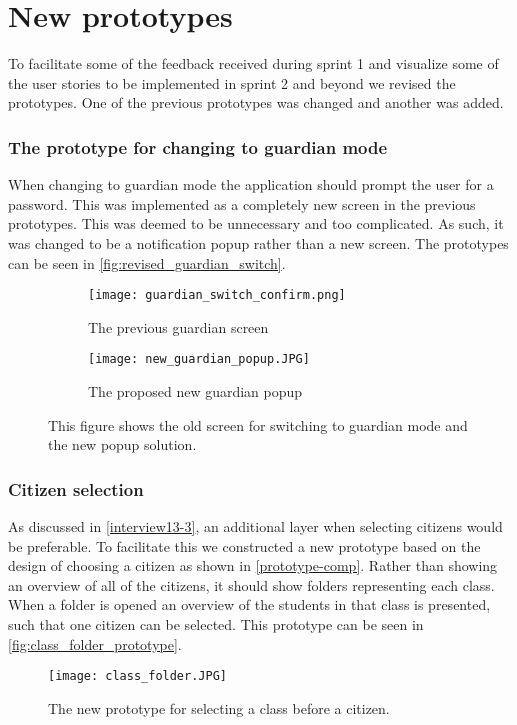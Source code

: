\section{New prototypes}
To facilitate some of the feedback received during sprint 1 and visualize some of the user stories to be implemented in sprint 2 and beyond we revised the prototypes.
One of the previous prototypes was changed and another was added.

\subsubsection{The prototype for changing to guardian mode}
When changing to guardian mode the application should prompt the user for a password.
This was implemented as a completely new screen in the previous prototypes.
This was deemed to be unnecessary and too complicated.
As such, it was changed to be a notification popup rather than a new screen.
The prototypes can be seen in \autoref{fig:revised_guardian_switch}.

\begin{figure}[H]
    \begin{subfigure}{0.5\textwidth}
    \texttt{[image: guardian\_switch\_confirm.png]} 
    \caption{The previous guardian screen}
    \label{fig:previous_guardian_screen}
    \end{subfigure}
    \begin{subfigure}{0.5\textwidth}
        \texttt{[image: new\_guardian\_popup.JPG]}
    \caption{The proposed new guardian popup}
    \label{fig:new_guardian_popup}
    \end{subfigure} 
    \caption{This figure shows the old screen for switching to guardian mode and the new popup solution.}
    \label{fig:revised_guardian_switch}
\end{figure}

\subsubsection{Citizen selection}
As discussed in \autoref{interview13-3}, an additional layer when selecting citizens would be preferable.
To facilitate this we constructed a new prototype based on the design of choosing a citizen as shown in \autoref{prototype-comp}.
Rather than showing an overview of all of the citizens, it should show folders representing each class.
When a folder is opened an overview of the students in that class is presented, such that one citizen can be selected.
This prototype can be seen in \autoref{fig:class_folder_prototype}.

\begin{figure}[h]
    \centering
    \texttt{[image: class\_folder.JPG]}
    \caption{The new prototype for selecting a class before a citizen.}
    \label{fig:class_folder_prototype}
  \end{figure}
